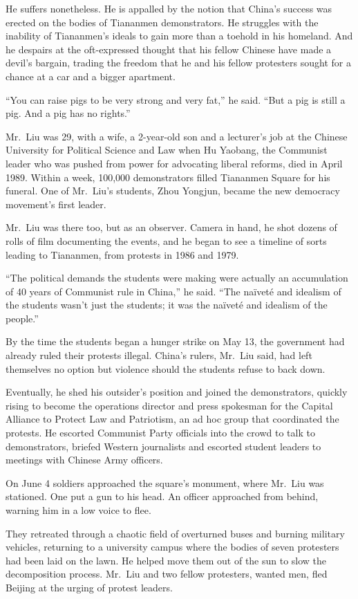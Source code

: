 \documentclass[12pt,a4paper,onecolumn]{article}
\begin{document}
He suffers nonetheless. He is appalled by the notion that China's success was erected on the bodies
of Tiananmen demonstrators. He struggles with the inability of Tiananmen's ideals to gain more than
a toehold in his homeland. And he despairs at the oft-expressed thought that his fellow Chinese have
made a devil's bargain, trading the freedom that he and his fellow protesters sought for a chance at
a car and a bigger apartment.

``You can raise pigs to be very strong and very fat,'' he said. ``But a pig is still a pig. And a
pig has no rights.''

Mr.~Liu was 29, with a wife, a 2-year-old son and a lecturer's job at the Chinese University for
Political Science and Law when Hu Yaobang, the Communist leader who was pushed from power for
advocating liberal reforms, died in April 1989. Within a week, 100,000 demonstrators filled
Tiananmen Square for his funeral. One of Mr.~Liu's students, Zhou Yongjun, became the new democracy
movement's first leader.

Mr.~Liu was there too, but as an observer. Camera in hand, he shot dozens of rolls of film
documenting the events, and he began to see a timeline of sorts leading to Tiananmen, from protests
in 1986 and 1979.

``The political demands the students were making were actually an accumulation of 40 years of
Communist rule in China,'' he said. ``The na\"ivet\'e and idealism of the students wasn't just the
students; it was the na\"ivet\'e and idealism of the people.''

By the time the students began a hunger strike on May 13, the government had already ruled their
protests illegal. China's rulers, Mr.~Liu said, had left themselves no option but violence should
the students refuse to back down.

Eventually, he shed his outsider's position and joined the demonstrators, quickly rising to become
the operations director and press spokesman for the Capital Alliance to Protect Law and Patriotism,
an ad hoc group that coordinated the protests. He escorted Communist Party officials into the crowd
to talk to demonstrators, briefed Western journalists and escorted student leaders to meetings with
Chinese Army officers.

On June 4 soldiers approached the square's monument, where Mr.~Liu was stationed. One put a gun to
his head. An officer approached from behind, warning him in a low voice to flee.

They retreated through a chaotic field of overturned buses and burning military vehicles, returning
to a university campus where the bodies of seven protesters had been laid on the lawn. He helped
move them out of the sun to slow the decomposition process. Mr.~Liu and two fellow protesters,
wanted men, fled Beijing at the urging of protest leaders.
\end{document}
